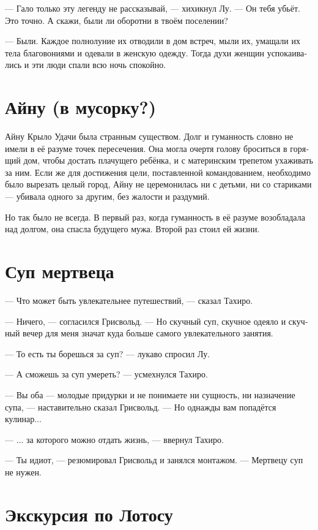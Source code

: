 \documentclass[a4paper,12pt,fleqn]{book}\usepackage{polyglossia}\setdefaultlanguage[babelshorthands=true]{russian}\setotherlanguage{english}\defaultfontfeatures{Ligatures=TeX,Mapping=tex-text}\usepackage{xcolor}\newcommand{\ml}[3]{#2}
\begin{document}
{--- Гало только эту легенду не рассказывай, --- хихикнул Лу.
--- Он тебя убьёт.
Это точно.
А скажи, были ли оборотни в твоём поселении?

--- Были.
Каждое полнолуние их отводили в дом встреч, мыли их, умащали их тела благовониями и одевали в женскую одежду.
Тогда духи женщин успокаивались и эти люди спали всю ночь спокойно.

\section{Айну (в мусорку?)}

Айну Крыло Удачи была странным существом.
Долг и гуманность словно не имели в её разуме точек пересечения.
Она могла очертя голову броситься в горящий дом, чтобы достать плачущего ребёнка, и с материнским трепетом ухаживать за ним.
Если же для достижения цели, поставленной командованием, необходимо было вырезать целый город, Айну не церемонилась ни с детьми, ни со стариками --- убивала одного за другим, без жалости и раздумий.

Но так было не всегда.
В первый раз, когда гуманность в её разуме возобладала над долгом, она спасла будущего мужа.
Второй раз стоил ей жизни.

\section{Суп мертвеца}

--- Что может быть увлекательнее путешествий, --- сказал Тахиро.

--- Ничего, --- согласился Грисвольд.
--- Но скучный суп, скучное одеяло и скучный вечер для меня значат куда больше самого увлекательного занятия.

--- То есть ты борешься за суп? --- лукаво спросил Лу.

--- А сможешь за суп умереть? --- усмехнулся Тахиро.

--- Вы оба --- молодые придурки и не понимаете ни сущность, ни назначение супа, --- наставительно сказал Грисвольд.
--- Но однажды вам попадётся кулинар...

--- ... за которого можно отдать жизнь, --- ввернул Тахиро.

--- Ты идиот, --- резюмировал Грисвольд и занялся монтажом.
--- Мертвецу суп не нужен.

\section{Экскурсия по Лотосу}

}
\end{document}

